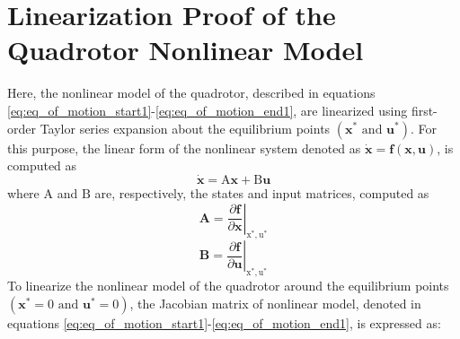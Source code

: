 \documentclass[3p]{elsarticle}
\newenvironment{proof}{\paragraph{Proof:}}{\hfill$\square$}
\begin{document}







  
 

\newpage
\appendix
\section{Linearization Proof of the Quadrotor Nonlinear Model }
\label{sec:linearization}
Here, the nonlinear model of the quadrotor, described in equations \eqref{eq:eq_of_motion_start1}-\eqref{eq:eq_of_motion_end1}, are linearized using first-order Taylor series expansion about the equilibrium points $(\boldsymbol{x}^* \text{ and } \boldsymbol{u}^*)$. For this purpose, the linear form of the nonlinear system denoted as $\dot{\boldsymbol{x}} = \boldsymbol{f}(\boldsymbol{x}, \boldsymbol{u})$, is computed as
\begin{equation}
    \dot{\boldsymbol{x}} = \boldsymbol{\mathrm{A}}
\boldsymbol{x} + \boldsymbol{\mathrm{B}}\boldsymbol{u}
\end{equation}
where $\boldsymbol{\mathrm{A}}$ and $\boldsymbol{\mathrm{B}}$ are, respectively, the states and input matrices, computed as \cite{simon2006optimal}
\begin{equation}
    \mathbf{A} = \left.\dfrac{\partial \mathbf{f}}{\partial \mathbf{x}}\right|_{\boldsymbol{{\mathrm{x}}}^*, \boldsymbol{{\mathrm{u}}}^*}
\end{equation}
\begin{equation}
    \mathbf{B} = \left.\dfrac{\partial \mathbf{f}}{\partial \mathbf{u}}\right|_{\boldsymbol{{\mathrm{x}}}^*, \boldsymbol{{\mathrm{u}}}^*}
\end{equation}
To linearize the nonlinear model of the quadrotor around the equilibrium points $(\boldsymbol{x}^* = 0 \text{ and } \boldsymbol{u}^* = 0)$, the Jacobian matrix of nonlinear model, denoted in equations \eqref{eq:eq_of_motion_start1}-\eqref{eq:eq_of_motion_end1}, is expressed as:
\end{document}
